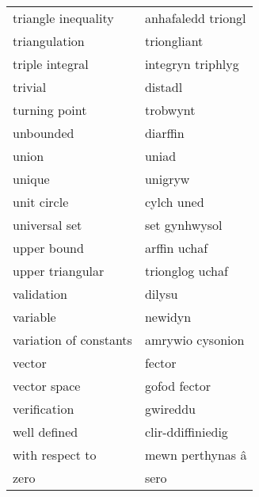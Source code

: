 \begin{supertabular}{p{0.22\textwidth}p{0.22\textwidth}}
              triangle inequality &               anhafaledd triongl \\
                    triangulation &                      triongliant \\
                  triple integral &                integryn triphlyg \\
                          trivial &                          distadl \\
                    turning point &                         trobwynt \\
                        unbounded &                         diarffin \\
                            union &                            uniad \\
                           unique &                          unigryw \\
                      unit circle &                       cylch uned \\
                    universal set &                    set gynhwysol \\
                      upper bound &                     arffin uchaf \\
                 upper triangular &                  trionglog uchaf \\
                       validation &                           dilysu \\
                         variable &                          newidyn \\
           variation of constants &                 amrywio cysonion \\
                           vector &                           fector \\
                     vector space &                     gofod fector \\
                     verification &                         gwireddu \\
                     well defined &                clir-ddiffiniedig \\
                  with respect to &                 mewn perthynas â \\
                             zero &                             sero \\
\end{supertabular}
